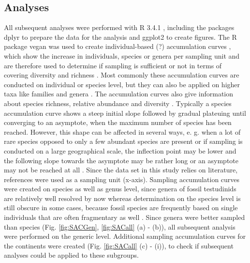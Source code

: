 \subsection{Analyses}
All subsequent analyses were performed with R 3.4.1 \citep{RCoreTeam2017}, including the packages dplyr \citep{Wickham2017} to prepare the data for the analysis and ggplot2 \citep{Wickham2009} to create figures. The R package vegan \citep{Oksanen2017} was used to create individual-based (?) accumulation curves , which show the increase in individuals, species or genera per sampling unit and are therefore used to determine if sampling is sufficient or not in terms of covering diversity and richness \citep{Thompson2002}. Most commonly these accumulation curves are conducted on individual or species level, but they can also be applied on higher taxa like families and genera \citep{Gotelli2011, Gotelli2001}. The accumulation curves also give information about species richness, relative abundance and diversity \citep{Thompson2002}. Typically a species accumulation curve shows a steep initial slope followed by gradual plateuing until converging to an asymptote, when the maximum number of species has been reached. However, this shape can be affected in several ways, e. g. when a lot of rare species opposed to only a few abundant species are present or if sampling is conducted on a large geographical scale, the inflection point may be lower and the following slope towards the asymptote may be rather long or an asymptote may not be reached at all \citep{Gotelli2011, Gotelli2001}. 
Since the data set in this study relies on literature, references were used as a sampling unit (x-axis). %
Sampling accumulation curves were created on species as well as genus level, since genera of fossil testudinids are relatively well resolved by now whereas determination on the species level is still obscure in some cases, because fossil species are frequently based on single individuals that are often fragmentary as well \citep{Brattstrom1961, DeLapparentdeBroin2001}. Since genera were better sampled than species (Fig. \ref{fig:SACGen}, \ref{fig:SACall} (a) - (b)), all subsequent analysis were performed on the generic level.
Additional sampling accumulation curves for the continents were created (Fig. \ref{fig:SACall} (c) -  (i)), to check if subsequent analyses could be applied to these subgroups. 

